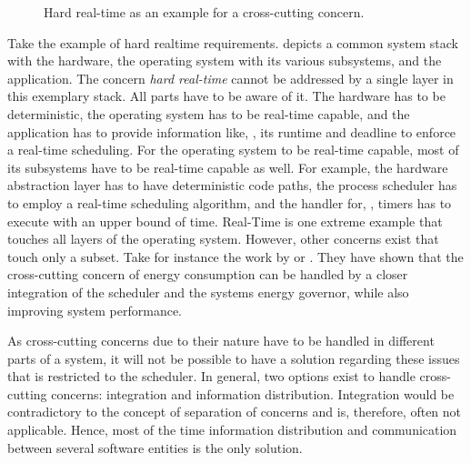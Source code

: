 \begin{figure}[t!] \centering
	\caption{Hard real-time as an example for a cross-cutting concern.}%
	\label{fig:analysis:cross}
\end{figure}

Take the example of hard realtime requirements.  depicts a common system stack with the hardware, the operating system with its various subsystems, and the application. The concern \emph{hard real-time} cannot be addressed by a single layer in this exemplary stack. All parts have to be aware of it. The hardware has to be deterministic, the operating system has to be real-time capable, and the application has to provide information like, \eg, its runtime and deadline to enforce a real-time scheduling. For the operating system to be real-time capable, most of its subsystems have to be real-time capable as well. For example, the hardware abstraction layer has to have deterministic code paths, the process scheduler has to employ a real-time scheduling algorithm, and the handler for, \eg, timers has to execute with an upper bound of time. Real-Time is one extreme example that touches all layers of the operating system. However, other concerns exist that touch only a subset. Take for instance the work by \textcite{Richling-2009-MultiCoreScheduling} or \textcite{Schoenherr-2010-HVFS}. They have shown that the cross-cutting concern of energy consumption can be handled by a closer integration of the scheduler and the systems energy governor, while also improving system performance.

As cross-cutting concerns due to their nature have to be handled in different parts of a system, it will not be possible to have a solution regarding these issues that is restricted to the scheduler. In general, two options exist to handle cross-cutting concerns: integration and information distribution. Integration would be contradictory to the concept of separation of concerns and is, therefore, often not applicable. Hence, most of the time information distribution and communication between several software entities is the only solution.
